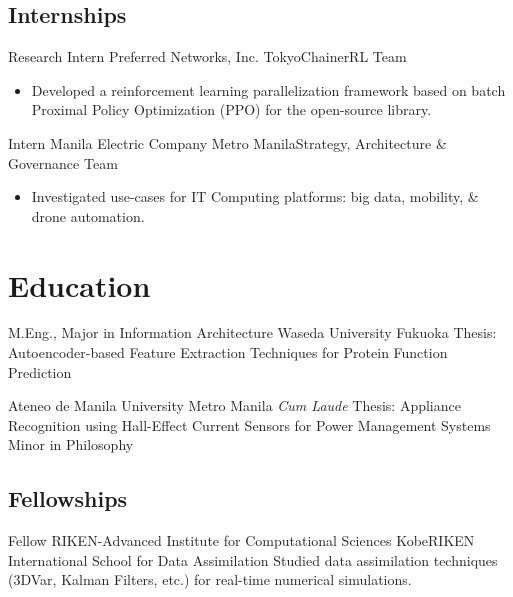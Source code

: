 \documentclass[12pt,a4paper]{moderncv}
\begin{document}
\subsection{Internships}
{Research Intern}
{Preferred Networks, Inc.}
{Tokyo}{ChainerRL Team}
{
    \begin{itemize}
        \item Developed a reinforcement learning parallelization framework
            based on batch Proximal Policy Optimization (PPO) for the
            open-source
            {\color{blue}}
            library.
    \end{itemize}
}
\vspace{0.5em}

{Intern}
{Manila Electric Company}
{Metro Manila}{Strategy, Architecture \& Governance Team}
{
    \begin{itemize}
        \item Investigated use-cases for IT Computing platforms: big
              data, mobility, \& drone automation.
    \end{itemize}
}


\section{Education}
{M.Eng., Major in Information Architecture}
{Waseda University}
{Fukuoka}{}
{Thesis: Autoencoder-based Feature Extraction Techniques for Protein
    Function Prediction}
\vspace{0.5em}

{Ateneo de Manila University}
{Metro Manila}
{\textit{Cum Laude}}
{
    Thesis: Appliance Recognition using Hall-Effect Current Sensors for
    Power Management Systems\\
    Minor in Philosophy
}
\vspace{0.5em}


\subsection{Fellowships}

{Fellow}
{RIKEN-Advanced Institute for Computational Sciences}
{Kobe}{RIKEN International School for Data Assimilation}
{Studied data assimilation techniques (3DVar, Kalman Filters, etc.) for real-time numerical simulations.}
\vspace{0.5em}
\end{document}
